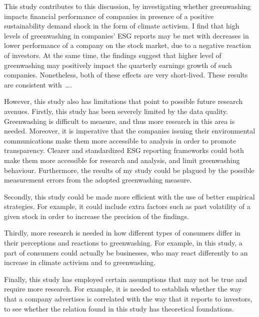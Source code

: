 \documentclass[12pt]{article}
\begin{document}
This study contributes to this discussion, by investigating whether greenwashing impacts financial performance of companies in presence of a positive sustainability demand shock in the form of climate activism. I find that high levels of greenwashing in companies' ESG reports may be met with decreases in lower performance of a company on the stock market, due to a negative reaction of investors. At the same time, the findings suggest that higher level of greenwashing may positively impact the quarterly earnings growth of such companies. Nonetheless, both of these effects are very short-lived. These results are consistent with\ \dots. 

However, this study also has limitations that point to possible future research avenues. Firstly, this study has been severely limited by the data quality. Greenwashing is difficult to measure, and thus more research in this area is needed. Moreover, it is imperative that the companies issuing their environmental communications make them more accessible to analysis in order to promote transparency. Clearer and standardized ESG reporting frameworks could both make them more accessible for research and analysis, and limit greenwashing behaviour. Furthermore, the results of my study could be plagued by the possible measurement errors from the adopted greenwashing measure. 

Secondly, this study could be made more efficient with the use of better empirical strategies. For example, it could include extra factors such as past volatility of a given stock in order to increase the precision of the findings. 

Thirdly, more research is needed in how different types of consumers differ in their perceptions and reactions to greenwashing. For example, in this study, a part of consumers could actually be businesses, who may react differently to an increase in climate activism and to greenwashing. 

Finally, this study has employed certain assumptions that may not be true and require more research. For example, it is needed to establish whether the way that a company advertises is correlated with the way that it reports to investors, to see whether the relation found in this study has theoretical foundations. 


\end{document}
